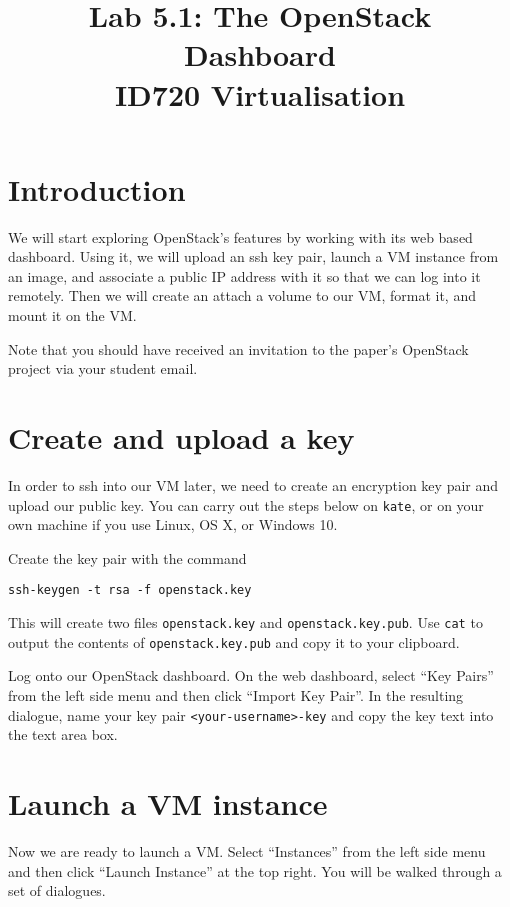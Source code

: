 \documentclass{article}
\begin{document}
\title{Lab 5.1: The OpenStack Dashboard \\ ID720 Virtualisation}
\date{}
\maketitle

\section*{Introduction}
We will start exploring OpenStack's features by working with its web based dashboard. Using it, we will upload an ssh key pair, launch a VM instance from an image, and associate a public IP address with it so that we can log into it remotely. Then we will create an attach a volume to our VM, format it, and mount it on the VM.

Note that you should have received an invitation to the paper's OpenStack project via your student email.



\section{Create and upload a key}
In order to ssh into our VM later, we need to create an encryption key pair and upload our public key. You can carry out the steps below on \texttt{kate}, or on your own machine if you use Linux, OS X, or Windows 10.

Create the key pair with the command

\begin{verbatim}
ssh-keygen -t rsa -f openstack.key
\end{verbatim}

This will create two files \texttt{openstack.key} and \texttt{openstack.key.pub}. Use \texttt{cat} to output the contents of \texttt{openstack.key.pub} and copy it to your clipboard.

Log onto our OpenStack dashboard. On the web dashboard, select ``Key Pairs'' from the left side menu and then click ``Import Key Pair''. In the resulting dialogue, name your key pair \texttt{<your-username>-key} and copy the key text into the text area box.

\section{Launch a VM instance}
Now we are ready to launch a VM. Select ``Instances'' from the left side menu and then click ``Launch Instance'' at the top right. You will be walked through a set of dialogues.
\end{document}
